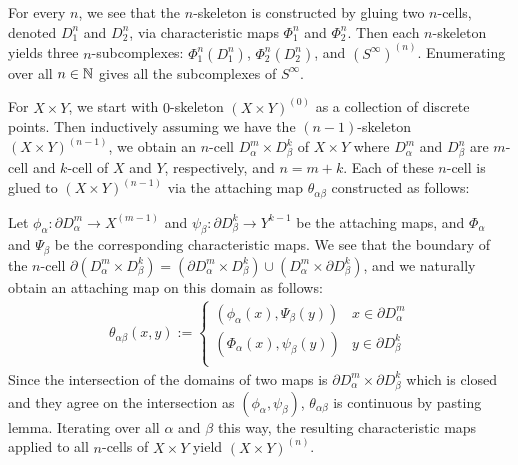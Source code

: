 \documentclass[12pt]{article}
\begin{document}
\begin{problem}[5]
For every $ n$, we see that the $ n$-skeleton is constructed by gluing two $ n$-cells, denoted  $ D_1^{n}$ and $D_2^{n}$, via characteristic maps $ \Phi_1^{n}$ and $ \Phi_2^{n}$. Then each $ n$-skeleton yields three $ n$-subcomplexes: $ \Phi_1^{n}(D_1^{n})$, $ \Phi_2^{n}(D_2^{n})$, and $ (S^{\infty})^{(n)}$. Enumerating over all $ n \in \mathbb{N}$ gives all the subcomplexes of $ S^{\infty}$.
\end{problem}
\begin{problem}[7]
For $ X \times Y$, we start with $ 0$-skeleton $ (X \times Y)^{(0)}$ as a collection of discrete points. Then inductively assuming we have the $ (n-1)$-skeleton  $ (X \times Y)^{(n-1)}$, we obtain an $ n$-cell $ D_{ \alpha}^{m} \times D_{ \beta}^{k}$ of $ X \times Y$ where $ D_{ \alpha}^{m}$ and $ D_{ \beta}^{n}$ are $ m$-cell and $ k$-cell of $ X$ and  $ Y$, respectively, and $ n=m+k$. Each of these $ n$-cell is glued to $ (X \times Y)^{(n-1)}$ via the attaching map $ \theta_{ \alpha \beta}$ constructed as follows:

Let $ \phi_{ \alpha}: \partial D_{ \alpha}^{m} \to X^{(m-1)}$ and $ \psi_{ \beta}: \partial D_{ \beta}^{k} \to Y^{k-1}$ be the attaching maps, and $ \Phi_{ \alpha}$ and $ \Psi_{ \beta}$ be the corresponding characteristic maps. We see that the boundary of the $ n$-cell $ \partial (D_{ \alpha}^{m} \times D_{ \beta}^{k}) = ( \partial D_{ \alpha}^{m} \times D_{ \beta}^{k}) \cup (D_{ \alpha}^{m} \times \partial D_{ \beta}^{k})$, and we naturally obtain an attaching map on this domain as follows:
\begin{align*}
\theta_{ \alpha \beta} (x,y):= \begin{cases}	
	(\phi_{ \alpha}(x), \Psi_{ \beta}(y)) & x \in \partial D_{ \alpha}^{m} \\
	(\Phi_{ \alpha}(x), \psi_{ \beta}(y)) & y \in \partial D_{ \beta} ^{k}\\
\end{cases}
\end{align*}
Since the intersection of the domains of two maps is $ \partial D_{ \alpha}^{m} \times \partial D_{ \beta}^{k}$ which is closed and they agree on the intersection as  $ (\phi_{ \alpha},\psi_{ \beta})$, $ \theta_{ \alpha \beta}$ is continuous by pasting lemma. Iterating over all $ \alpha$ and $ \beta$ this way, the resulting characteristic maps applied to all $ n$-cells of  $ X \times Y$ yield $ (X \times Y)^{(n)}$.


\end{problem}
\end{document}
